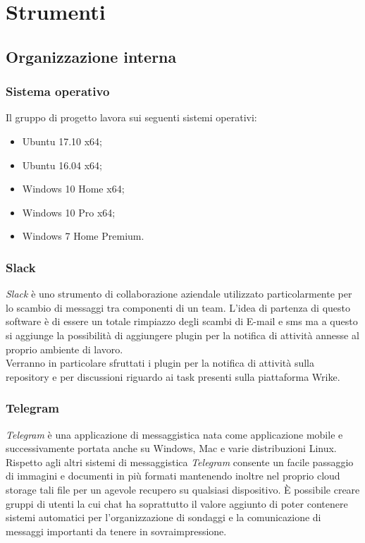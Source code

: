\documentclass[../NormediProgetto.tex]{subfiles}
\begin{document}
	\section{Strumenti}
	
	\subsection{Organizzazione interna}
	
	\subsubsection{Sistema operativo}
	
	Il gruppo di progetto lavora sui seguenti sistemi operativi:
	\begin{itemize}
		\item Ubuntu 17.10 x64;
		\item Ubuntu 16.04  x64;
		\item Windows 10 Home x64;
		\item Windows 10 Pro x64;
		\item Windows 7 Home Premium.
	\end{itemize}
	
	\subsubsection{Slack}
	
	\textit{Slack} è uno strumento di collaborazione aziendale utilizzato particolarmente per lo scambio di messaggi tra componenti di un team. L'idea di partenza di questo software è di essere un totale rimpiazzo degli scambi di E-mail e sms ma a questo si aggiunge la possibilità di aggiungere plugin per la notifica di attività annesse al proprio ambiente di lavoro.
	\\ \noindent Verranno in particolare sfruttati i plugin per la notifica di attività sulla repository e per discussioni riguardo ai task presenti sulla piattaforma Wrike.
	
	\subsubsection{Telegram}
	
	\textit{Telegram} è una applicazione di messaggistica nata come applicazione mobile e successivamente portata anche su Windows, Mac e varie distribuzioni Linux. Rispetto agli altri sistemi di messaggistica \textit{Telegram} consente un facile passaggio di immagini e documenti in più formati mantenendo inoltre nel proprio cloud storage tali file per un agevole recupero su qualsiasi dispositivo. È possibile creare gruppi di utenti la cui chat ha soprattutto il valore aggiunto di poter contenere sistemi automatici per l'organizzazione di sondaggi e la comunicazione di messaggi importanti da tenere in sovraimpressione.
	
\end{document}

